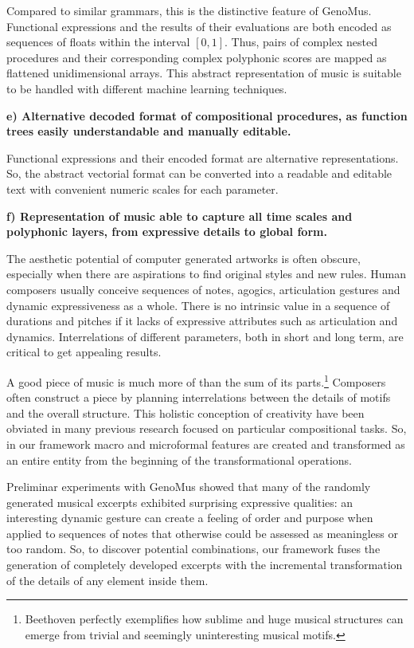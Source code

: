 \documentclass{article}
\begin{document}
Compared to similar grammars, this is the distinctive feature of GenoMus. Functional expressions and the results of their evaluations are both encoded as sequences of floats within the interval $[0, 1]$. Thus, pairs of complex nested procedures and their corresponding complex polyphonic scores are mapped as flattened unidimensional arrays. This abstract representation of music is suitable to be handled with different machine learning techniques. 

\textbf{e) Alternative decoded format of compositional procedures, as function trees easily understandable and manually editable.}

Functional expressions and their encoded format are alternative representations. So, the abstract vectorial format can be converted into a readable and editable text with convenient numeric scales for each parameter.

\textbf{f) Representation of music able to capture all time scales and polyphonic layers, from expressive details to global form.} 

The aesthetic potential of computer generated artworks is often obscure, especially when there are aspirations to find original styles and new rules. Human composers usually conceive sequences of notes, agogics, articulation gestures and dynamic expressiveness as a whole. There is no intrinsic value in a sequence of durations and pitches if it lacks of expressive attributes such as articulation and dynamics. Interrelations of different parameters, both in short and long term, are critical to get appealing results.

A good piece of music is much more of than the sum of its parts.\footnote{Beethoven perfectly exemplifies how sublime and huge musical structures can emerge from trivial and seemingly uninteresting musical motifs.} Composers often construct a piece by planning interrelations between the details of motifs and the overall structure. This holistic conception of creativity have been obviated in many previous research focused on particular compositional tasks. So, in our framework macro and microformal features are created and transformed as an entire entity from the beginning of the transformational operations.

Preliminar experiments with GenoMus showed that many of the randomly generated musical excerpts exhibited surprising expressive qualities: an interesting dynamic gesture can create a feeling of order and purpose when applied to sequences of notes that otherwise could be assessed as meaningless or too random. So, to discover potential combinations, our framework fuses the generation of completely developed excerpts with the incremental transformation of the details of any element inside them.
\end{document}
